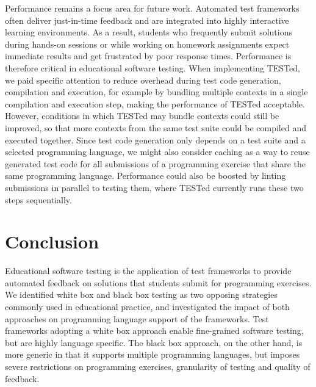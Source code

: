 \documentclass[../main]{subfiles}
\begin{document}
Performance remains a focus area for future work.
Automated test frameworks often deliver just-in-time feedback and are integrated into highly interactive learning environments.
As a result, students who frequently submit solutions during hands-on sessions or while working on homework assignments expect immediate results and get frustrated by poor response times.
Performance is therefore critical in educational software testing.
When implementing TESTed, we paid specific attention to reduce overhead during test code generation, compilation and execution, for example by bundling multiple contexts in a single compilation and execution step, making the performance of TESTed acceptable.
However, conditions in which TESTed may bundle contexts could still be improved, so that more contexts from the same test suite could be compiled and executed together.
Since test code generation only depends on a test suite and a selected programming language, we might also consider caching as a way to reuse generated test code for all submissions of a programming exercise that share the same programming language.
Performance could also be boosted by linting submissions in parallel to testing them, where TESTed currently runs these two steps sequentially.

\section{Conclusion}\label{sec:tested1-conclusion}

Educational software testing is the application of test frameworks to provide automated feedback on solutions that students submit for programming exercises.
We identified white box and black box testing as two opposing strategies commonly used in educational practice, and investigated the impact of both approaches on programming language support of the frameworks.
Test frameworks adopting a white box approach enable fine-grained software testing, but are highly language specific.
The black box approach, on the other hand, is more generic in that it supports multiple programming languages, but imposes severe restrictions on programming exercises, granularity of testing and quality of feedback.
\end{document}

